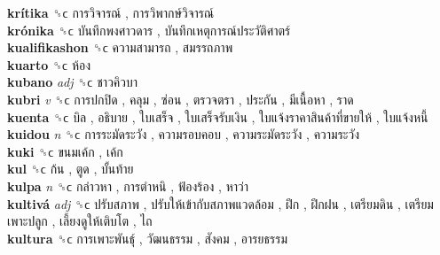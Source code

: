 \textbf{krítika} ␝ϲ   การวิจารณ์ ,  การวิพากษ์วิจารณ์   \\
\textbf{krónika} ␝ϲ   บันทึกพงศาวดาร ,  บันทึกเหตุการณ์ประวัติศาตร์   \\
\textbf{kualifikashon} ␝ϲ   ความสามารถ ,  สมรรถภาพ   \\
\textbf{kuarto} ␝ϲ   ห้อง   \\
\textbf{kubano} \emph{adj}  ␝ϲ   ชาวคิวบา   \\
\textbf{kubri} \emph{v}  ␝ϲ   การปกปิด ,  คลุม ,  ซ่อน ,  ตรวจตรา ,  ประกัน ,  มีเนื้อหา ,  ราด   \\
\textbf{kuenta} ␝ϲ   บิล ,  อธิบาย ,  ใบเสร็จ ,  ใบเสร็จรับเงิน ,  ใบแจ้งราคาสินค้าที่ขายให้ ,  ใบแจ้งหนี้   \\
\textbf{kuidou} \emph{n}  ␝ϲ   การระมัดระวัง ,  ความรอบคอบ ,  ความระมัดระวัง ,  ความระวัง   \\
\textbf{kuki} ␝ϲ   ขนมเค้ก ,  เค้ก   \\
\textbf{kul} ␝ϲ   ก้น ,  ตูด ,  บั้นท้าย   \\
\textbf{kulpa} \emph{n}  ␝ϲ   กล่าวหา ,  การตำหนิ ,  ฟ้องร้อง ,  หาว่า   \\
\textbf{kultivá} \emph{adj}  ␝ϲ   ปรับสภาพ ,  ปรับให้เข้ากับสภาพแวดล้อม ,  ฝึก ,  ฝึกฝน ,  เตรียมดิน ,  เตรียมเพาะปลูก ,  เลี้ยงดูให้เติบโต ,  ไถ   \\
\textbf{kultura} ␝ϲ   การเพาะพันธุ์ ,  วัฒนธรรม ,  สังคม ,  อารยธรรม   \\

